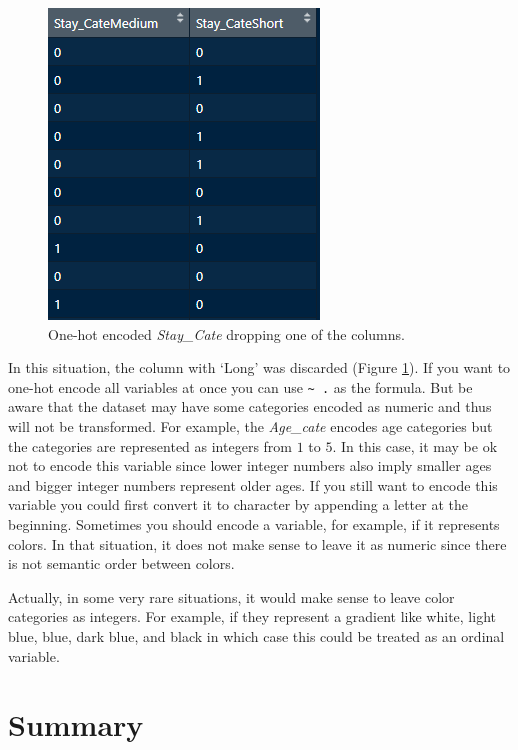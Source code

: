 \documentclass[
  11pt,
]{krantz}
\makeatletter
\newenvironment{kframe}{%
\medskip{}
\setlength{\fboxsep}{.8em}
 \def\at@end@of@kframe{}%
 \ifinner\ifhmode%
  \def\at@end@of@kframe{\end{minipage}}%
  \begin{minipage}{\columnwidth}%
 \fi\fi%
 \def\FrameCommand##1{\hskip\@totalleftmargin \hskip-\fboxsep
 \colorbox{shadecolor}{##1}\hskip-\fboxsep
     \hskip-\linewidth \hskip-\@totalleftmargin \hskip\columnwidth}%
 \MakeFramed {\advance\hsize-\width
   \@totalleftmargin\z@ \linewidth\hsize
   \@setminipage}}%
 {\par\unskip\endMakeFramed%
 \at@end@of@kframe}
\newenvironment{rmdblock}[1]
  {
  \begin{itemize}
  \renewcommand{\labelitemi}{
    \raisebox{-.7\height}[0pt][0pt]{
      {\setkeys{Gin}{width=3em,keepaspectratio}\texttt{[image: images/icons/\#1]}}
    }
  }
  \setlength{\fboxsep}{1em}
  \begin{kframe}
  \item
  }
  {
  \end{kframe}
  \end{itemize}
  }
\newenvironment{rmdinfo}
  {\begin{rmdblock}{info}}
  {\end{rmdblock}}
\makeatother
\begin{document}
\begin{figure}

{\centering \includegraphics[width=0.4\linewidth]{images/stay_cate_2} 

}

\caption{One-hot encoded \emph{Stay\_Cate} dropping one of the columns.}\label{fig:stayCate2}
\end{figure}

In this situation, the column with `Long' was discarded (Figure \ref{fig:stayCate2}). If you want to one-hot encode all variables at once you can use \texttt{\textasciitilde{}\ .} as the formula. But be aware that the dataset may have some categories encoded as numeric and thus will not be transformed. For example, the \emph{Age\_cate} encodes age categories but the categories are represented as integers from \(1\) to \(5\). In this case, it may be ok not to encode this variable since lower integer numbers also imply smaller ages and bigger integer numbers represent older ages. If you still want to encode this variable you could first convert it to character by appending a letter at the beginning. Sometimes you should encode a variable, for example, if it represents colors. In that situation, it does not make sense to leave it as numeric since there is not semantic order between colors.

\begin{rmdinfo}
Actually, in some very rare situations, it would make sense to leave color categories as integers. For example, if they represent a gradient like white, light blue, blue, dark blue, and black in which case this could be treated as an ordinal variable.
\end{rmdinfo}

\hypertarget{SummaryPreprocessing}{%
\section{Summary}\label{SummaryPreprocessing}}
\end{document}
